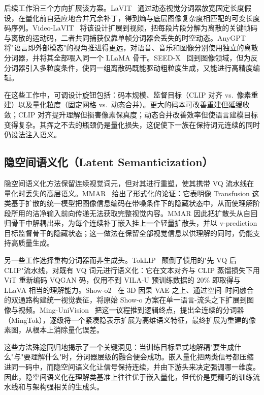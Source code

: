 后续工作沿三个方向扩展该方案。LaVIT~\cite{jin2024lavit} 通过动态视觉分词器放宽固定长度假设，在量化前自适应地合并冗余补丁，得到熵与底层图像复杂度相匹配的可变长度码序列。Video-LaVIT~\cite{DBLP:conf/icml/Jin00XCJHSLZ0GM24} 将该设计扩展到视频，把每段片段分解为离散的关键帧码与离散的运动码，二者共同捕获仅靠单帧分词器会丢失的时空动态。AnyGPT~\cite{DBLP:conf/acl/ZhanDYZZLZYZL0F24} 将"语言即外部模态"的视角推进得更远，对语音、音乐和图像分别使用独立的离散分词器，并将其全部喂入同一个 LLaMA 骨干。SEED-X~\cite{ge2024seedx} 回到图像领域，但为反分词器引入多粒度条件，使同一组离散码既能驱动粗粒度生成，又能进行高精度编辑。

在这些工作中，可调设计旋钮包括：码本规模、监督目标（CLIP 对齐 vs.\ 像素重建）以及量化粒度（固定网格 vs.\ 动态合并）。更大的码本可改善重建但延缓收敛；CLIP 对齐提升理解但损害像素保真度；动态合并改善效率但使语言建模目标变得复杂。其挥之不去的瓶颈仍是量化损失，这促使下一族在保持词元连续的同时仍设法注入语义。

\subsection{隐空间语义化（Latent Semanticization）}
\label{subsec:latent-sem}

隐空间语义化方法保留连续视觉词元，但对其进行重塑，使其携带 VQ 流水线在量化时丢失的高层语义。MMAR~\cite{DBLP:conf/cvpr/YangYZRZ0Z25} 给出了形式化的论证：它表明像 Transfusion 这类基于扩散的统一模型把图像信息编码在带噪条件下的隐藏状态中，从而使理解阶段所用的洁净输入前向传递无法获取完整视觉内容。MMAR 因此把扩散头从自回归骨干中解耦出来，为每个连续补丁嵌入挂上一个轻量扩散头，并以 v-prediction 目标监督骨干的隐藏状态；这一做法在保留全部视觉信息以供理解的同时，仍能支持高质量生成。

另一些工作选择重构分词器而非生成头。TokLIP~\cite{lin2025toklip} 颠倒了惯用的"先 VQ 后 CLIP"流水线，对既有 VQ 词元进行语义化：它在文本对齐与 CLIP 蒸馏损失下用 ViT 重新编码 VQGAN 码，仅用不到 VILA-U 预训练数据的 20\% 即取得与 LLaVA 相当的理解能力。Show-o2~\cite{xie2025showo2} 在 3D 因果 VAE 之上、通过空间--时间融合的双通路构建统一视觉表征，将原始 Show-o 方案在单一语言-流头之下扩展到图像与视频。Ming-UniVision~\cite{huang2025minguni} 把这一议程推到逻辑终点，提出全连续的分词器（MingTok），逐级将一个紧凑隐表示扩展为高维语义特征，最终扩展为重建的像素图，从根本上消除量化误差。

这些方法殊途同归地揭示了一个关键洞见：当训练目标显式地解耦"要生成什么"与"要理解什么"时，分词器层级的融合便会成功。嵌入量化把两类信号都压缩进同一码中，而隐空间语义化让信号保持连续，并由下游头来决定强调哪一维度。因此，隐空间语义化在理解类基准上往往优于嵌入量化，但代价是更精巧的训练流水线和与架构强相关的生成头。

